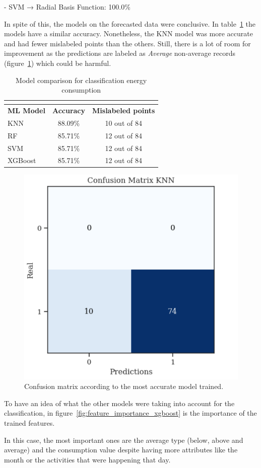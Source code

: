 \documentclass[a4paper,12pt,twoside]{ThesisStyle}
\begin{document}
- SVM → Radial Basis Function: 100.0\%

In spite of this, the models on the forecasted data were conclusive. In table~\ref{taula:ModelEvaluation} the models have a similar accuracy. Nonetheless, the KNN model was more accurate and had fewer mislabeled points than the others. Still, there is a lot of room for improvement as the predictions are labeled as \textit{Average} non-average records (figure~\ref{fig:confusion_knn}) which could be harmful.

\begin{longtable}{lcc}
\caption{Model comparison for classification energy consumption}  \\
\label{taula:ModelEvaluation}  \\
\hline
\textbf{ML Model} & \textbf{Accuracy} & \textbf{Mislabeled points} \\ 
\hline
\endfirsthead
%
\endhead
%
KNN  & 88.09\%  & 10 out of 84  \\ \hline
RF    & 85.71\% & 12 out of 84 \\ \hline
SVM   & 85.71\%  & 12 out of 84  \\ \hline
XGBoost  & 85.71\%  & 12 out of 84  \\ \hline
\end{longtable}

\begin{figure}[hbt]
\centering
\includegraphics[width=7 cm]{imatges/confusion_knn.png}
\caption{\label{fig:confusion_knn} Confusion matrix according to the most accurate model trained.}
\end{figure}

To have an idea of what the other models were taking into account for the classification, in figure~\ref{fig:feature_importance_xgboost} is the importance of the trained features. 

In this case, the most important ones are the average type (below, above and average) and the consumption value despite having more attributes like the month or the activities that were happening that day.
\end{document}
